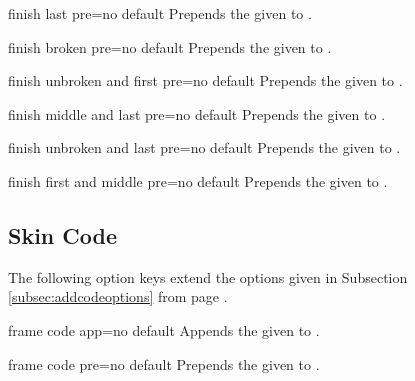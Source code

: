 \begin{docTcbKey}{finish last pre}{=}{no default}
  Prepends the given  to .
\end{docTcbKey}

\begin{docTcbKey}{finish broken pre}{=}{no default}
  Prepends the given  to .
\end{docTcbKey}

\begin{docTcbKey}{finish unbroken and first pre}{=}{no default}
  Prepends the given  to .
\end{docTcbKey}

\begin{docTcbKey}{finish middle and last pre}{=}{no default}
  Prepends the given  to .
\end{docTcbKey}

\begin{docTcbKey}{finish unbroken and last pre}{=}{no default}
  Prepends the given  to .
\end{docTcbKey}

\begin{docTcbKey}[][doc new=2014-09-19]{finish first and middle pre}{=}{no default}
  Prepends the given  to .
\end{docTcbKey}


\subsection{Skin Code}
The following option keys extend the options given in Subsection \ref{subsec:addcodeoptions}
from page \pageref{subsec:addcodeoptions}.

\begin{docTcbKey}{frame code app}{=}{no default}
  Appends the given  to .
\end{docTcbKey}

\begin{docTcbKey}{frame code pre}{=}{no default}
  Prepends the given  to .
\end{docTcbKey}

